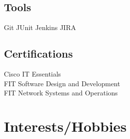 \documentclass[]{deedy-resume-openfont}
\begin{document}
\begin{minipage}[t]{0.33\textwidth}
\subsection{Tools}
Git \textbullet{} JUnit \textbullet{} Jenkins \textbullet{} JIRA\\
\vspace{1mm}
\sectionsep



\subsection{Certifications}
Cisco IT Essentials\\
FIT Software Design and Development \\
FIT Network Systems and Operations \\
\sectionsep

\section{Interests/Hobbies}



\end{minipage}
\end{document}
